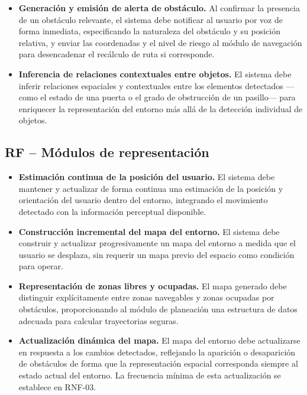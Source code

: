 \begin{itemize}
    \item[\textbf{RF-12}] \textbf{Generación y emisión de alerta de obstáculo.}
    Al confirmar la presencia de un obstáculo relevante, el sistema debe notificar al usuario
    por voz de forma inmediata, especificando la naturaleza del obstáculo y su posición
    relativa, y enviar las coordenadas y el nivel de riesgo al módulo de navegación para
    desencadenar el recálculo de ruta si corresponde.

    \item[\textbf{RF-13}] \textbf{Inferencia de relaciones contextuales entre objetos.}
    El sistema debe inferir relaciones espaciales y contextuales entre los elementos
    detectados ---como el estado de una puerta o el grado de obstrucción de un pasillo---
    para enriquecer la representación del entorno más allá de la detección individual
    de objetos.

\end{itemize}

\subsection*{RF -- Módulos de representación}

\begin{itemize}

    \item[\textbf{RF-14}] \textbf{Estimación continua de la posición del usuario.}
    El sistema debe mantener y actualizar de forma continua una estimación de la posición y
    orientación del usuario dentro del entorno, integrando el movimiento detectado con la
    información perceptual disponible.

    \item[\textbf{RF-15}] \textbf{Construcción incremental del mapa del entorno.}
    El sistema debe construir y actualizar progresivamente un mapa del entorno a medida que
    el usuario se desplaza, sin requerir un mapa previo del espacio como condición para
    operar.

    \item[\textbf{RF-16}] \textbf{Representación de zonas libres y ocupadas.}
    El mapa generado debe distinguir explícitamente entre zonas navegables y zonas ocupadas
    por obstáculos, proporcionando al módulo de planeación una estructura de datos adecuada
    para calcular trayectorias seguras.

    \item[\textbf{RF-17}] \textbf{Actualización dinámica del mapa.}
    El mapa del entorno debe actualizarse en respuesta a los cambios detectados, reflejando
    la aparición o desaparición de obstáculos de forma que la representación espacial
    corresponda siempre al estado actual del entorno. La frecuencia mínima de esta
    actualización se establece en RNF-03.

\end{itemize}

